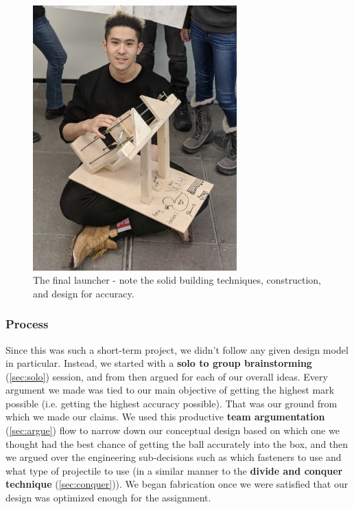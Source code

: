 \documentclass[a4paper,12pt]{article}
\begin{document}
\begin{figure}[H]
\centering
\includegraphics[width=0.7\textwidth]{img/image007.png}
\caption{The final launcher - note the solid building techniques, construction, and design for accuracy.}
\label{}
\end{figure}

\subsubsection{Process}
Since this was such a short-term project, we didn’t follow any given design model in particular. Instead, we started with a \textbf{solo to group brainstorming} (\ref{sec:solo}) session, and from then argued for each of our overall ideas. Every argument we made was tied to our main objective of getting the highest mark possible (i.e. getting the highest accuracy possible). That was our ground from which we made our claims. We used this productive \textbf{team argumentation} (\ref{sec:argue}) flow to narrow down our conceptual design based on which one we thought had the best chance of getting the ball accurately into the box, and then we argued over the engineering sub-decisions such as which fasteners to use and what type of projectile to use (in a similar manner to the \textbf{divide and conquer technique} (\ref{sec:conquer})). We began fabrication once we were satisfied that our design was optimized enough for the assignment.
\end{document}
